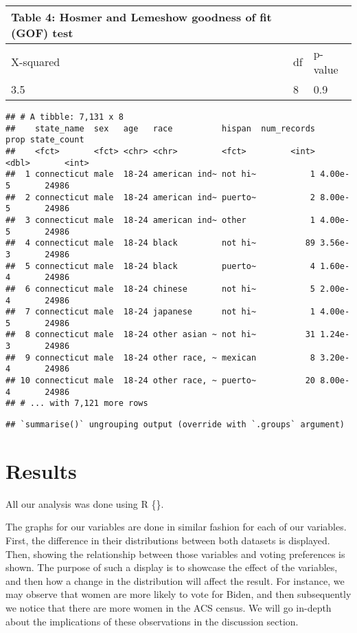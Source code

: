 \documentclass[
]{article}
\begin{document}
\begin{longtable}[]{@{}lll@{}}
\toprule
Table 4: Hosmer and Lemeshow goodness of fit (GOF) test & &\tabularnewline
\midrule
\endhead
X-squared & df & p-value\tabularnewline
3.5 & 8 & 0.9\tabularnewline
\bottomrule
\end{longtable}

\begin{verbatim}
## # A tibble: 7,131 x 8
##    state_name  sex   age   race          hispan  num_records    prop state_count
##    <fct>       <fct> <chr> <chr>         <fct>         <int>   <dbl>       <int>
##  1 connecticut male  18-24 american ind~ not hi~           1 4.00e-5       24986
##  2 connecticut male  18-24 american ind~ puerto~           2 8.00e-5       24986
##  3 connecticut male  18-24 american ind~ other             1 4.00e-5       24986
##  4 connecticut male  18-24 black         not hi~          89 3.56e-3       24986
##  5 connecticut male  18-24 black         puerto~           4 1.60e-4       24986
##  6 connecticut male  18-24 chinese       not hi~           5 2.00e-4       24986
##  7 connecticut male  18-24 japanese      not hi~           1 4.00e-5       24986
##  8 connecticut male  18-24 other asian ~ not hi~          31 1.24e-3       24986
##  9 connecticut male  18-24 other race, ~ mexican           8 3.20e-4       24986
## 10 connecticut male  18-24 other race, ~ puerto~          20 8.00e-4       24986
## # ... with 7,121 more rows
\end{verbatim}

\begin{verbatim}
## `summarise()` ungrouping output (override with `.groups` argument)
\end{verbatim}

\hypertarget{results}{%
\section{Results}\label{results}}

All our analysis was done using R \{\citet{CiteR}\}.

The graphs for our variables are done in similar fashion for each of our variables. First, the difference in their distributions between both datasets is displayed. Then, showing the relationship between those variables and voting preferences is shown. The purpose of such a display is to showcase the effect of the variables, and then how a change in the distribution will affect the result. For instance, we may observe that women are more likely to vote for Biden, and then subsequently we notice that there are more women in the ACS census. We will go in-depth about the implications of these observations in the discussion section.
\end{document}
